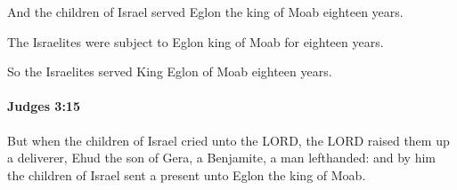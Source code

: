 			\begin{versebox}
					\item[BHS] 
					\item[ASV] And the children of Israel served Eglon the king of Moab eighteen years.
					\item[NIV] The Israelites were subject to Eglon king of Moab for eighteen years.
					\item[NRSV] So the Israelites served King Eglon of Moab eighteen years.
			\end{versebox}

		\paragraph{Judges 3:15} %
			\label{JUDGES-3-15}

			But when the children of Israel cried unto the LORD, the LORD raised them up a deliverer, Ehud the son of Gera, a Benjamite, a man lefthanded: and by him the children of Israel sent a present unto Eglon the king of Moab.

